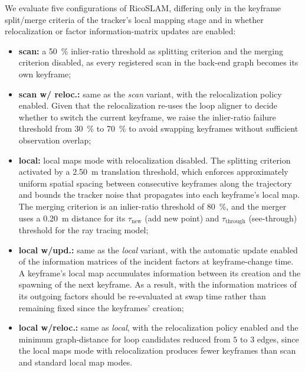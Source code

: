 We evaluate five configurations of RicoSLAM, differing only in the keyframe
split/merge criteria of the tracker's local mapping stage and in whether
relocalization or factor information-matrix updates are enabled:
\begin{itemize}
\item \textbf{scan:} a \SI{50}{\percent} inlier-ratio threshold as splitting
      criterion and the merging criterion disabled, as every registered scan in
      the back-end graph becomes its own keyframe;
\item \textbf{scan w/ reloc.:} same as the \emph{scan} variant, with
      the relocalization policy enabled. Given that the relocalization re-uses
      the loop aligner to decide whether to switch the current keyframe,
      we raise the inlier-ratio failure threshold from \SI{30}{\percent} to
      \SI{70}{\percent} to avoid swapping keyframes without sufficient
      observation overlap;
\item \textbf{local:} local maps mode with relocalization disabled.
      The splitting criterion activated by a \SI{2.50}{\metre} translation
      threshold, which enforces approximately uniform spatial spacing between
      consecutive keyframes along the trajectory and bounds the tracker noise
      that propagates into each keyframe's local map.
      The merging criterion is an inlier-ratio threshold of \SI{80}{\percent},
      and the merger uses a \SI{0.20}{\metre} distance for its
      $\tau_{\mathrm{new}}$ (add new point) and $\tau_{\mathrm{through}}$
      (see-through) threshold for the ray tracing model;
\item \textbf{local w/upd.:} same as the \emph{local} variant, with
      the automatic update enabled of the information matrices of
      the incident factors at keyframe-change time.
      A keyframe's local map accumulates information between its creation and
      the spawning of the next keyframe. As a result, with the information
      matrices of its outgoing factors should be re-evaluated at swap time
      rather than remaining fixed since the keyframes' creation;
\item \textbf{local w/reloc.:} same as \emph{local}, with the relocalization
      policy enabled and the minimum graph-distance for loop candidates reduced
      from $5$ to $3$ edges, since the local maps mode with relocalization
      produces fewer keyframes than scan and standard local map modes.
\end{itemize}

